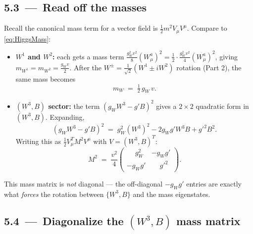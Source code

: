\documentclass[11pt]{article}
\begin{document}
\subsection*{5.3 \,---\, Read off the masses}

\begin{stepbox}[title=Step 5.3: Identify mass terms]
Recall the canonical mass term for a vector field is $\tfrac{1}{2} m^2 V_\mu V^\mu$.
Compare to \eqref{eq:HiggsMass}:
\begin{itemize}[leftmargin=*]
  \item \textbf{$W^1$ and $W^2$:} each gets a mass term $\tfrac{g_W^2 v^2}{8} (W^a_\mu)^2 = \tfrac{1}{2} \cdot \tfrac{g_W^2 v^2}{4} (W^a_\mu)^2$,
        giving $m_{W^1} = m_{W^2} = \tfrac{g_W v}{2}$. After the $W^\pm = \tfrac{1}{\sqrt2}(W^1 \pm i W^2)$
        rotation (Part 2), the same mass becomes
        \[
        \boxed{\;m_W \;=\; \tfrac{1}{2}\, g_W\, v.\;}
        \]
  \item \textbf{$(W^3, B)$ sector:} the term $(g_W W^3 - g' B)^2$ gives a $2\times 2$
        quadratic form in $(W^3, B)$. Expanding,
        \[
        (g_W W^3 - g' B)^2 \;=\; g_W^2 (W^3)^2 - 2 g_W g' W^3 B + g'^2 B^2 .
        \]
        Writing this as $\tfrac{1}{2} V_\mu^T M^2 V^\mu$ with $V = (W^3, B)^T$:
        \[
        M^2 \;=\; \frac{v^2}{4}
        \begin{pmatrix} \phantom{-}g_W^2 & -g_W g' \\[2pt] -g_W g' & \phantom{-}g'^2 \end{pmatrix} .
        \]
\end{itemize}
This mass matrix is \emph{not} diagonal --- the off-diagonal $-g_W g'$ entries are exactly
what \emph{forces} the rotation between $\{W^3, B\}$ and the mass eigenstates.
\end{stepbox}

\subsection*{5.4 \,---\, Diagonalize the $(W^3, B)$ mass matrix}
\end{document}
